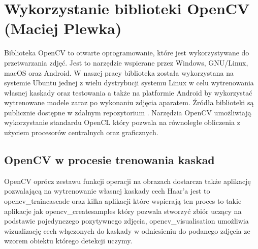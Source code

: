 \section{Wykorzystanie biblioteki OpenCV (Maciej Plewka)}\label{sec:opencv}
Biblioteka OpenCV to otwarte oprogramowanie, które jest wykorzystywane do przetwarzania zdjęć. Jest to narzędzie wspierane przez Windows, GNU/Linux, macOS oraz Android. W naszej pracy biblioteka została wykorzystana na systemie Ubuntu jednej z wielu dystrybucji systemu Linux w celu wytrenowania własnej kaskady oraz testowania a także na platformie Android by wykorzystać wytrenowane modele zaraz po wykonaniu zdjęcia aparatem. Źródła biblioteki są publicznie dostępne w zdalnym repozytorium \cite{OpenCVSource}. Narzędzia OpenCV umożliwiają wykorzystanie standardu OpenCL który pozwala na równoległe obliczenia z użyciem procesorów centralnych oraz graficznych.


\subsection{OpenCV w procesie trenowania kaskad}

OpenCV oprócz zestawu funkcji operacji na obrazach dostarcza także aplikację pozwalającą na wytrenowanie własnej kaskady cech Haar’a jest to opencv\_traincascade oraz kilka aplikacji które wspierają ten proces to takie aplikacje jak opencv\_createsamples który pozwala stworzyć zbiór uczący na podstawie pojedynczego pozytywnego zdjęcia, opencv\_visualisation umożliwia wizualizację cech włączonych do kaskady w odniesieniu do podanego zdjęcia ze wzorem obiektu którego detekcji uczymy.

